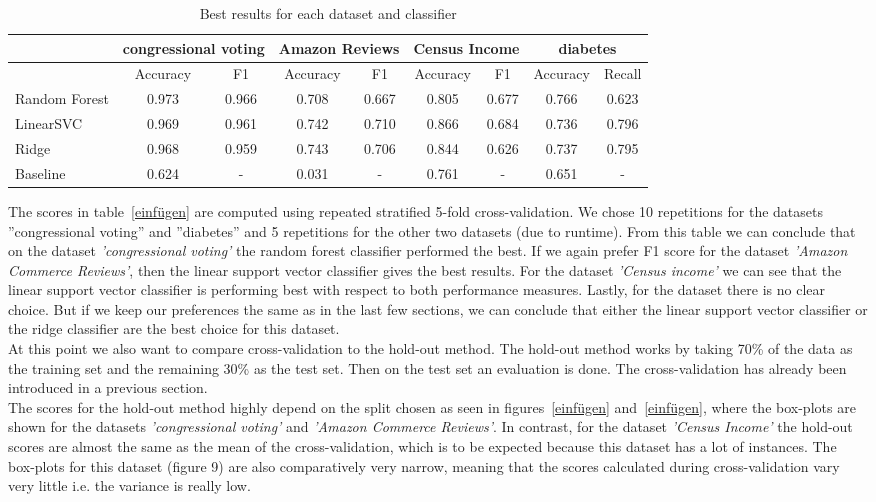\documentclass[a4paper,12pt]{article}
\begin{document}
\begin{table}[h!]
\centering
\footnotesize
\begin{tabular}{|l|c|c|c|c|c|c|c|c|}
\hline
& \multicolumn{2}{c|}{congressional voting} & \multicolumn{2}{c|}{Amazon Reviews} & \multicolumn{2}{c|}{Census Income} & \multicolumn{2}{c|}{diabetes} \\
\hline
& Accuracy & F1 & Accuracy & F1 & Accuracy & F1 & Accuracy & Recall \\
\hline
Random Forest & 0.973 & 0.966 & 0.708 & 0.667 & 0.805 & 0.677 & 0.766 & 0.623 \\
\hline
LinearSVC & 0.969 & 0.961 & 0.742 & 0.710 & 0.866 & 0.684 & 0.736 & 0.796 \\
\hline
Ridge & 0.968 & 0.959 & 0.743 & 0.706 & 0.844 & 0.626 & 0.737 & 0.795 \\
\hline
Baseline & 0.624 & - & 0.031 & - & 0.761 & - & 0.651 & - \\
\hline
\end{tabular}
\vspace{0.3cm}
\caption{Best results for each dataset and classifier}
\label{tab:best_results}
\end{table}
The scores in table~\ref{einfügen} are computed using repeated stratified 5-fold
cross-validation. We chose 10 repetitions for the datasets ”congressional voting” and ”diabetes” and 5
repetitions for the other two datasets (due to runtime).
From this table we can conclude that on the dataset \textit{'congressional voting'} the random forest classifier
performed the best. If we again prefer F1 score for the dataset \textit{'Amazon Commerce Reviews'}, then the
linear support vector classifier gives the best results. For the dataset \textit{'Census income'} we can see that
the linear support vector classifier is performing best with respect to both performance measures. Lastly,
for the  dataset there is no clear choice. But if we keep our preferences the same as in the
last few sections, we can conclude that either the linear support vector classifier or the ridge classifier
are the best choice for this dataset. \\
At this point we also want to compare cross-validation to the hold-out method. 
The hold-out method works by taking 70\% of the data as the training set and the remaining 30\% as the test set.
Then on the test set an evaluation is done. The cross-validation has already been introduced in a previous section.\\
The scores for the hold-out method
highly depend on the split chosen as seen in figures~\ref{einfügen} and~\ref{einfügen}, where the box-plots are shown for the
datasets \textit{'congressional voting'} and \textit{'Amazon Commerce Reviews'}. In contrast, for the dataset 
\textit{'Census Income'} the hold-out scores are almost the same as the mean of the cross-validation, which is to be
expected because this dataset has a lot of instances. The box-plots for this dataset (figure 9) are also
comparatively very narrow, meaning that the scores calculated during cross-validation vary very little i.e.
the variance is really low.
\end{document}
